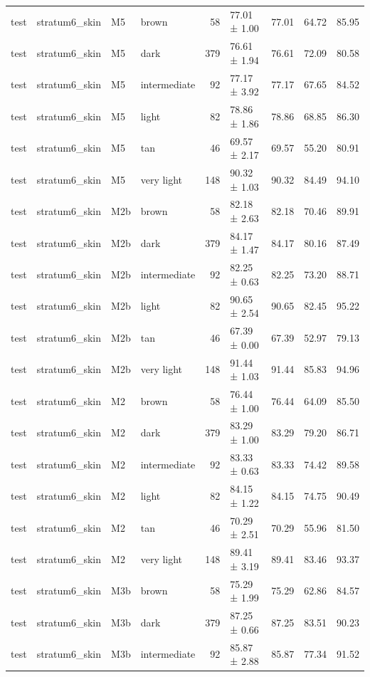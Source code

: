 \begin{tabular}{llllrlrrr}
test & stratum6\_skin & M5 & brown & 58 & 77.01 ± 1.00 & 77.01 & 64.72 & 85.95 \\
test & stratum6\_skin & M5 & dark & 379 & 76.61 ± 1.94 & 76.61 & 72.09 & 80.58 \\
test & stratum6\_skin & M5 & intermediate & 92 & 77.17 ± 3.92 & 77.17 & 67.65 & 84.52 \\
test & stratum6\_skin & M5 & light & 82 & 78.86 ± 1.86 & 78.86 & 68.85 & 86.30 \\
test & stratum6\_skin & M5 & tan & 46 & 69.57 ± 2.17 & 69.57 & 55.20 & 80.91 \\
test & stratum6\_skin & M5 & very light & 148 & 90.32 ± 1.03 & 90.32 & 84.49 & 94.10 \\
test & stratum6\_skin & M2b & brown & 58 & 82.18 ± 2.63 & 82.18 & 70.46 & 89.91 \\
test & stratum6\_skin & M2b & dark & 379 & 84.17 ± 1.47 & 84.17 & 80.16 & 87.49 \\
test & stratum6\_skin & M2b & intermediate & 92 & 82.25 ± 0.63 & 82.25 & 73.20 & 88.71 \\
test & stratum6\_skin & M2b & light & 82 & 90.65 ± 2.54 & 90.65 & 82.45 & 95.22 \\
test & stratum6\_skin & M2b & tan & 46 & 67.39 ± 0.00 & 67.39 & 52.97 & 79.13 \\
test & stratum6\_skin & M2b & very light & 148 & 91.44 ± 1.03 & 91.44 & 85.83 & 94.96 \\
test & stratum6\_skin & M2 & brown & 58 & 76.44 ± 1.00 & 76.44 & 64.09 & 85.50 \\
test & stratum6\_skin & M2 & dark & 379 & 83.29 ± 1.00 & 83.29 & 79.20 & 86.71 \\
test & stratum6\_skin & M2 & intermediate & 92 & 83.33 ± 0.63 & 83.33 & 74.42 & 89.58 \\
test & stratum6\_skin & M2 & light & 82 & 84.15 ± 1.22 & 84.15 & 74.75 & 90.49 \\
test & stratum6\_skin & M2 & tan & 46 & 70.29 ± 2.51 & 70.29 & 55.96 & 81.50 \\
test & stratum6\_skin & M2 & very light & 148 & 89.41 ± 3.19 & 89.41 & 83.46 & 93.37 \\
test & stratum6\_skin & M3b & brown & 58 & 75.29 ± 1.99 & 75.29 & 62.86 & 84.57 \\
test & stratum6\_skin & M3b & dark & 379 & 87.25 ± 0.66 & 87.25 & 83.51 & 90.23 \\
test & stratum6\_skin & M3b & intermediate & 92 & 85.87 ± 2.88 & 85.87 & 77.34 & 91.52 \\

\end{tabular}
